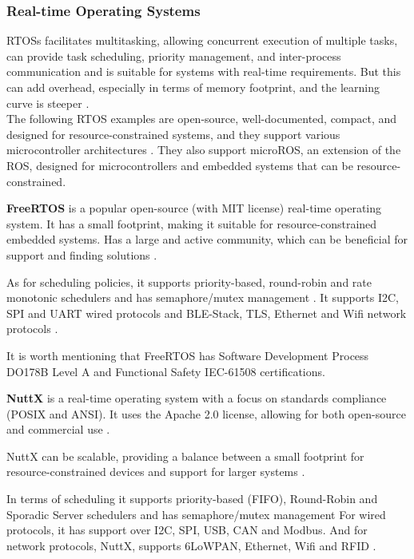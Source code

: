 \subsubsection{Real-time Operating Systems}
\glspl{RTOS} facilitates multitasking, allowing concurrent execution of multiple tasks, can provide task scheduling, priority management, and inter-process communication and is suitable for systems with real-time requirements.
But this can add overhead, especially in terms of memory footprint, and the learning curve is steeper \cite{RTOS1}.\\
The following \gls{RTOS} examples are open-source, well-documented, compact, and designed for resource-constrained systems, and they support various microcontroller architectures \cite{RTOS5}.
They also support microROS, an extension of the \gls{ROS}, designed for microcontrollers and embedded systems that can be resource-constrained.


\textbf{FreeRTOS} is a popular open-source (with MIT license) real-time operating system.
It has a small footprint, making it suitable for resource-constrained embedded systems.
Has a large and active community, which can be beneficial for support and finding solutions \cite{RTOS6}.

As for scheduling policies, it supports priority-based, round-robin and rate monotonic schedulers and has semaphore/mutex management \cite{compRTOS}.
It supports \gls{I2C}, \gls{SPI} and \gls{UART} wired protocols and \gls{BLE}-Stack, \gls{TLS}, Ethernet and \gls{Wifi} network protocols \cite{compRTOS}.

It is worth mentioning that FreeRTOS has Software Development Process DO178B Level A and Functional Safety IEC-61508 certifications.


\textbf{NuttX} is a real-time operating system with a focus on standards compliance (POSIX and ANSI).
It uses the Apache 2.0 license, allowing for both open-source and commercial use \cite{nuttx}.

NuttX can be scalable, providing a balance between a small footprint for resource-constrained devices and support for larger systems \cite{nuttx}.

In terms of scheduling it supports priority-based (\gls{FIFO}), Round-Robin and Sporadic Server schedulers and has semaphore/mutex management
For wired protocols, it has support over \gls{I2C}, \gls{SPI}, \gls{USB}, \gls{CAN} and Modbus.
And for network protocols, NuttX, supports 6LoWPAN, Ethernet, \gls{Wifi} and \gls{RFID} \cite{compRTOS}.


